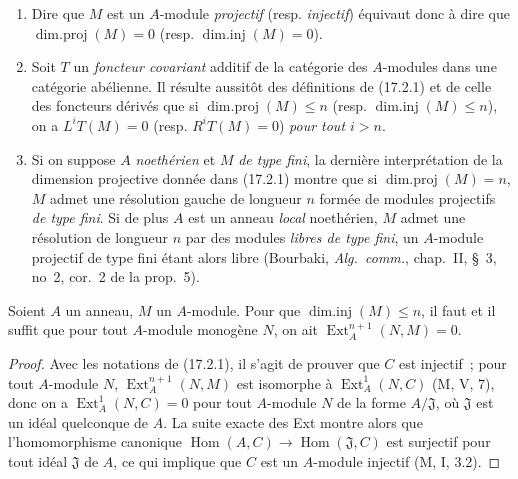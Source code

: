 \begin{remarks}[17.2.2]
\label{0.17.2.2-fr}
\begin{enumerate}
  \item[\rm (i)] Dire que $M$ est un $A$-module \emph{projectif} (resp.
  \emph{injectif}) équivaut donc à dire que
  $\operatorname{dim.proj}(M)=0$ (resp. $\operatorname{dim.inj}(M)=0$).
  \item[\rm (ii)] Soit $T$ un \emph{foncteur covariant} additif de la catégorie
  des $A$-modules dans une catégorie abélienne. Il résulte aussitôt des
  définitions de (17.2.1) et de celle des
  foncteurs dérivés que si $\operatorname{dim.proj}(M)\leq n$ (resp.
  $\operatorname{dim.inj}(M)\leq n$), on a $L^iT(M)=0$ (resp.
  $R^iT(M)=0$) \emph{pour tout $i>n$}.
  \item[\rm (iii)] Si on suppose $A$ \emph{noethérien} et $M$ \emph{de type
  fini}, la dernière interprétation de la dimension projective donnée dans
  (17.2.1) montre que si $\operatorname{dim.proj}(M)=n$, $M$ admet une
  résolution gauche de longueur $n$ formée de modules projectifs \emph{de type
  fini}. Si de plus $A$ est un anneau \emph{local} noethérien, $M$ admet une
  résolution de longueur $n$ par des modules \emph{libres de type fini}, un
  $A$-module projectif de type fini étant alors libre (Bourbaki,
  \emph{Alg.~comm.}, chap.~II, \S~3, no~2, cor.~2 de la prop.~5).
\end{enumerate}
\end{remarks}

\begin{lemma}[17.2.3]
\label{0.17.2.3-fr}
Soient $A$ un anneau, $M$ un $A$-module. Pour que
$\operatorname{dim.inj}(M)\leq n$, il faut et il suffit que pour tout
$A$-module monogène $N$, on ait $\operatorname{Ext}^{n+1}_A(N,M)=0$.
\end{lemma}

\begin{proof}
Avec les notations de (17.2.1), il s'agit de prouver que $C$ est injectif~;
pour tout $A$-module $N$, $\operatorname{Ext}^{n+1}_A(N,M)$ est isomorphe à
$\operatorname{Ext}^1_A(N,C)$ (M, V, 7), donc on a
$\operatorname{Ext}^1_A(N,C)=0$ pour tout $A$-module $N$ de la forme
$A/\mathfrak{J}$, où $\mathfrak{J}$ est un idéal quelconque de $A$. La suite
exacte des Ext montre alors que l'homomorphisme canonique
$\operatorname{Hom}(A,C)\longrightarrow\operatorname{Hom}(\mathfrak{J},C)$ est
surjectif pour tout idéal $\mathfrak{J}$ de $A$, ce qui implique que $C$ est un
$A$-module injectif (M, I, 3.2).
\end{proof}

